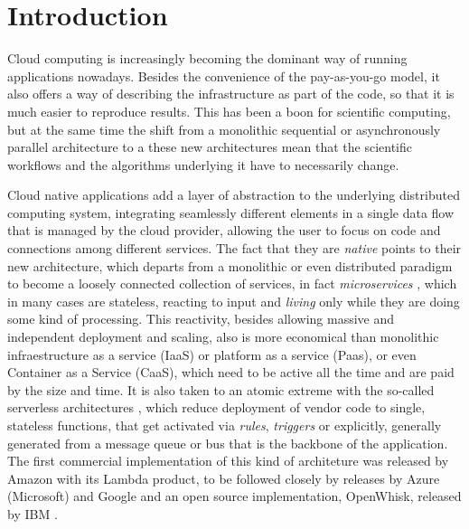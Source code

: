 \documentclass[sigconf]{acmart}
\begin{document}


\maketitle

\section{Introduction}

Cloud computing is increasingly becoming the dominant way of running
applications nowadays. Besides the convenience of the pay-as-you-go
model, it also offers a way of describing the infrastructure as part
of the code, so that it is much easier to reproduce results. This has
been a boon for scientific computing, but at the same time the shift
from a monolithic sequential or asynchronously parallel architecture
to a these new architectures mean that the scientific workflows and
the algorithms underlying it have to necessarily change. 

  Cloud native applications add a layer of abstraction to the
  underlying distributed computing system, integrating seamlessly
  different elements in a single data flow that is managed by the
  cloud provider, allowing the user to focus on code and connections
  among different services. The fact that they are {\em native} points
  to their new architecture, which departs from a monolithic or even
  distributed paradigm to become a loosely connected collection of
  services, in fact {\em microservices} \cite{microservices}, which in many cases are stateless, reacting to input and
  {\em living} only while they are doing some kind of processing. This
  reactivity, besides allowing massive and independent deployment and
  scaling, also is more economical than monolithic infraestructure as
  a service (IaaS) or platform as a service (Paas), or even Container
  as a Service (CaaS), which need to be active all the time and are
  paid by the size and time. It is also taken to an atomic extreme
  with the so-called serverless architectures \cite{Varghese2018849},
  which reduce deployment of vendor code to single, stateless
  functions, that get activated via {\em rules}, {\em triggers} or
  explicitly, generally generated from a message queue or bus that
  is the backbone of the application. The first commercial
  implementation of this kind of architeture was released by Amazon
  with its Lambda product, to be followed closely by releases by Azure
  (Microsoft) and Google and an open source implementation, OpenWhisk,
  released by IBM \cite{Baldini2016287}. 
  
\end{document}
